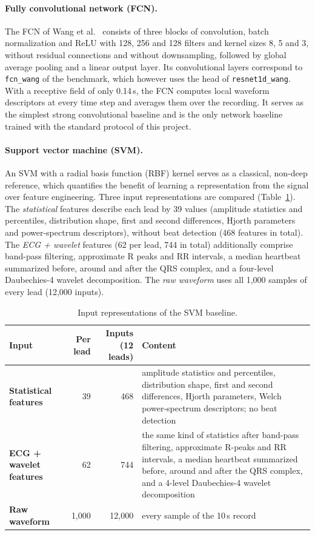\documentclass{article}
\newcommand{\wang}{\texttt{resnet1d\_wang}}
\newcommand{\fcnwang}{\texttt{fcn\_wang}}
\begin{document}
\paragraph{Fully convolutional network (FCN).} The FCN of Wang et al.\ \citep{wang2017} consists of three blocks of convolution, batch normalization and ReLU with 128, 256 and 128 filters and kernel sizes 8, 5 and 3, without residual connections and without downsampling, followed by global average pooling and a linear output layer. Its convolutional layers correspond to \fcnwang{} of the benchmark, which however uses the head of \wang{}. With a receptive field of only 0.14\,s, the FCN computes local waveform descriptors at every time step and averages them over the recording. It serves as the simplest strong convolutional baseline and is the only network baseline trained with the standard protocol of this project.

\paragraph{Support vector machine (SVM).} An SVM with a radial basis function (RBF) kernel \citep{cortes1995} serves as a classical, non-deep reference, which quantifies the benefit of learning a representation from the signal over feature engineering. Three input representations are compared (Table~\ref{tab:svminputs}). The \emph{statistical} features describe each lead by 39 values (amplitude statistics and percentiles, distribution shape, first and second differences, Hjorth parameters and power-spectrum descriptors), without beat detection (468 features in total). The \emph{ECG + wavelet} features (62 per lead, 744 in total) additionally comprise band-pass filtering, approximate R peaks and RR intervals, a median heartbeat summarized before, around and after the QRS complex, and a four-level Daubechies-4 wavelet decomposition. The \emph{raw waveform} uses all 1,000 samples of every lead (12,000 inputs).

\begin{table}[htb]
  \caption{Input representations of the SVM baseline.}
  \label{tab:svminputs}
  \centering\footnotesize
  \begin{tabularx}{\linewidth}{lrrX}
    \toprule
    Input & Per lead & Inputs (12 leads) & Content \\
    \midrule
    \textbf{Statistical features} & 39 & 468 & amplitude statistics and percentiles, distribution shape, first and second differences, Hjorth parameters, Welch power-spectrum descriptors; no beat detection \\
    \textbf{ECG + wavelet features} & 62 & 744 & the same kind of statistics after band-pass filtering, approximate R-peaks and RR intervals, a median heartbeat summarized before, around and after the QRS complex, and a 4-level Daubechies-4 wavelet decomposition \\
    \textbf{Raw waveform} & 1,000 & 12,000 & every sample of the 10\,s record \\
    \bottomrule
  \end{tabularx}
\end{table}
\end{document}
